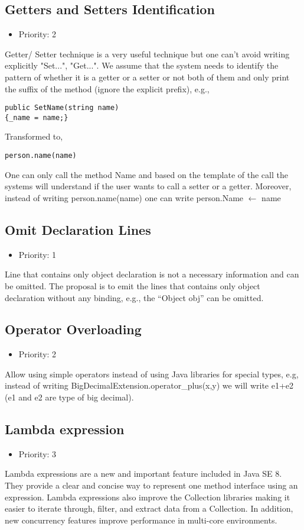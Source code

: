 \subsection{Getters and Setters Identification}
\begin{itemize}
	\item Priority: 2
\end{itemize}
Getter/ Setter technique is a very useful technique but one can't avoid writing explicitly "Set...", "Get...". We assume that the system needs to identify the pattern of whether it is a getter or a setter or not both of them and only print the suffix of the method (ignore the explicit prefix), e.g., 
\begin{lstlisting}
public SetName(string name)
{_name = name;}
\end{lstlisting}
Transformed to,
\begin{lstlisting}
person.name(name)
\end{lstlisting}
One can only call the method Name and based on the template of the call the systems will understand if the user wants to call a setter or a getter. Moreover, instead of writing person.name(name) one can write person.Name $\leftarrow$ name
\subsection{Omit Declaration Lines}
\begin{itemize}
	\item Priority: 1
\end{itemize}
Line that contains only object declaration is not a necessary information and can be omitted. The proposal is to emit the lines that contains only object declaration without any binding, e.g., the “Object obj” can be omitted.
\subsection{Operator Overloading}
\begin{itemize}
	\item Priority: 2
\end{itemize}
Allow using simple operators instead of using Java libraries for special types, e.g, instead of writing BigDecimalExtension.operator\_plus(x,y) we will write e1+e2 (e1 and e2 are type of big decimal).
\subsection{Lambda expression}
\begin{itemize}
	\item Priority: 3
\end{itemize}
Lambda expressions are a new and important feature included in Java SE 8. They provide a clear and concise way to represent one method interface using an expression. Lambda expressions also improve the Collection libraries making it easier to iterate through, filter, and extract data from a Collection. In addition, new concurrency features improve performance in multi-core environments.
